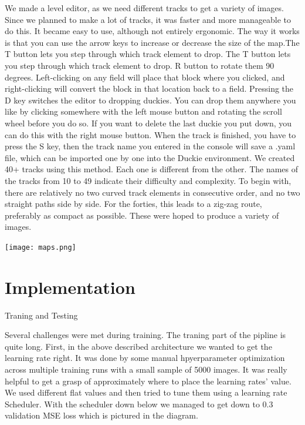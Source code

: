 \documentclass{article}
\begin{document}
We made a level editor, as we need different tracks to get a variety of images. Since we planned to make a lot of tracks, it was faster and more manageable to do this. It became easy to use, although not entirely ergonomic.
The way it works is that you can use the arrow keys to increase or decrease the size of the map.The T button lets you step through which track element to drop. The T button lets you step through which track element to drop.  R button to rotate them 90 degrees. Left-clicking on any field will place that block where you clicked, and right-clicking will convert the block in that location back to a field. Pressing the D key switches the editor to dropping duckies. You can drop them anywhere you like by clicking somewhere with the left mouse button and rotating the scroll wheel before you do so. If you want to delete the last duckie you put down, you can do this with the right mouse button.
When the track is finished, you have to press the S key, then the track name you entered in the console will save a .yaml file, which can be imported one by one into the Duckie environment.
We created 40+ tracks using this method. Each one is different from the other. The names of the tracks from 10 to 49 indicate their difficulty and complexity. To begin with, there are relatively no two curved track elements in consecutive order, and no two straight paths side by side. For the forties, this leads to a zig-zag route, preferably as compact as possible.
These were hoped to produce a variety of images.

\vspace*{2\baselineskip}

\texttt{[image: maps.png]}

\pagebreak


\section*{Implementation}

Traning and Testing

Several challenges were met during training. The traning part of the pipline is quite long. First, in
the above described architecture we wanted to get the learning rate right. It was done by some
manual hpyerparameter optimization across multiple training runs with a small sample of 5000
images. It was really helpful to get a grasp of approximately where to place the learning rates’
value. We used different flat values and then tried to tune them using a learning rate Scheduler.
With the scheduler down below we managed to get down to 0.3 validation MSE loss which is
pictured in the diagram.
\end{document}
